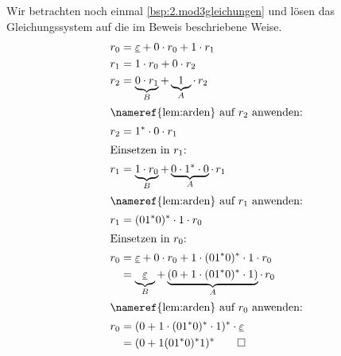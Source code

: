 \begin{Bsp}
Wir betrachten noch einmal \autoref{bsp:2.mod3gleichungen} und lösen das Gleichungssystem auf die im Beweis beschriebene Weise.
	\begin{align*}
		r_0 &= \1 + 0\cdot r_0 + 1\cdot r_1\\
		r_1 &= 1\cdot r_0 + 0\cdot r_2\\
		r_2 &= \underbrace{0\cdot r_1}_B + \underbrace{1}_A \mathop{\cdot} r_2\\
		\shortintertext{\nameref{lem:arden} auf $r_2$ anwenden:}
		r_2 &= 1^*\cdot 0\cdot r_1\\
		\shortintertext{Einsetzen in $r_1$:}
		r_1 &= \underbrace{1\cdot r_0}_B+\underbrace{0\cdot 1^*\cdot 0}_A \mathop{\cdot} r_1\\
		\shortintertext{\nameref{lem:arden} auf $r_1$ anwenden:}
		r_1 &= (01^*0)^*\cdot 1\cdot r_0\\
		\shortintertext{Einsetzen in $r_0$:}
		r_0 &= \1 + 0\cdot r_0+1\cdot (01^*0)^*\cdot 1\cdot r_0\\
		&= \underbrace{\1}_B+\underbrace{(0+1\cdot (01^*0)^*\cdot 1)}_A \mathop{\cdot} r_0\\
		\shortintertext{\nameref{lem:arden} auf $r_0$ anwenden:}
		r_0 &= (0+1\cdot (01^*0)^*\cdot 1)^*\cdot \1 \\
		&= (0+1(01^*0)^*1)^*
		\qedhere
	\end{align*}
\end{Bsp}
%
